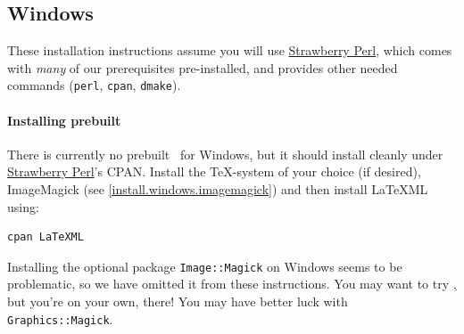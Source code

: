 \documentclass{article}
\begin{document}

\subsection{Windows}
These installation instructions assume you will use
\href{http://strawberryperl.com}{Strawberry Perl},
which comes with \emph{many} of our prerequisites pre-installed,
and provides other needed commands (\texttt{perl}, \texttt{cpan}, \texttt{dmake}).

\paragraph{Installing prebuilt}\label{install.windows}
There is currently no prebuilt \LaTeXML\ for Windows,
but it should install cleanly under \href{http://strawberryperl.com}{Strawberry Perl}'s CPAN.
Install the \TeX-system of your choice (if desired),
ImageMagick (see \ref{install.windows.imagemagick})
and then install LaTeXML using:
\begin{lstlisting}[style=shell]
cpan LaTeXML
\end{lstlisting}

Installing the optional package \texttt{Image::Magick} on Windows seems to be problematic,
so we have omitted it from these instructions.
You may want to try \href{ImageMagick}, but
you're on your own, there!  You may  have better luck with \texttt{Graphics::Magick}.
\end{document}
